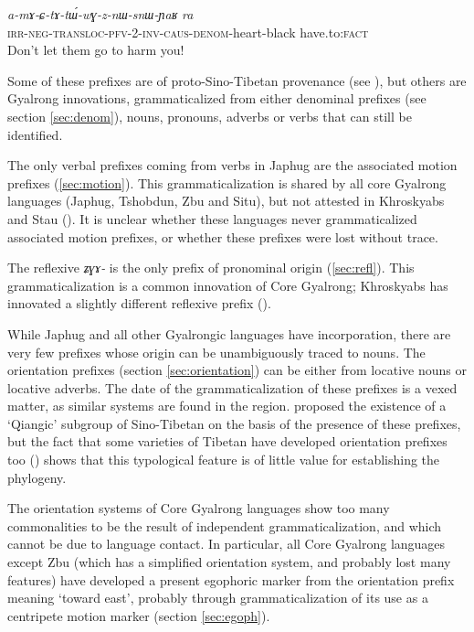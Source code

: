 \documentclass[oneside,a4paper,11pt]{article}
\newcommand{\ipa}[1]{\mbox{\phon\textit{#1}}} %
\begin{document}
\begin{exe}
\ex  \label{ex:amaCtAtWwGznWsnWYaR}
\gll
	\ipa{a-mɤ-ɕ-tɤ-tɯ́-wɣ-z-nɯ-snɯ-ɲaʁ}  	\ipa{ra}  \\
  \textsc{irr-neg-transloc-pfv-2-inv-caus-denom}-heart-black have.to:\textsc{fact} \\
\glt Don't let them go to harm you!
\end{exe} 

Some of these prefixes are of proto-Sino-Tibetan provenance (see \citealt{delancey11prefixes, delancey14second, jacques12agreement}), but others are Gyalrong innovations, grammaticalized from either denominal prefixes (see section \ref{sec:denom}), nouns, pronouns, adverbs or verbs that can still be identified.

The only verbal prefixes coming from verbs in Japhug are the associated motion prefixes (\ref{sec:motion}). This grammaticalization is shared by all core Gyalrong languages (Japhug, Tshobdun, Zbu and Situ), but not attested in Khroskyabs and Stau (\citealt{lai13affixale}). It is unclear whether these languages never grammaticalized associated motion prefixes, or whether these prefixes were lost without trace.

The reflexive \ipa{ʑɣɤ-} is the only prefix of pronominal origin (\ref{sec:refl}). This grammaticalization is a common innovation of Core Gyalrong; Khroskyabs has innovated a slightly different reflexive prefix (\citealt[156-7]{lai13affixale}).

While Japhug and all other Gyalrongic languages have incorporation, there are very few prefixes whose origin can be unambiguously traced to nouns. The orientation prefixes (section \ref{sec:orientation}) can be either from locative nouns or locative adverbs. The date of the grammaticalization of these prefixes is a vexed matter, as similar systems are found in the region. \citet{sun83liujiang} proposed the existence of a `Qiangic' subgroup of Sino-Tibetan on the basis of the presence of these prefixes, but the fact that some varieties of Tibetan have developed orientation prefixes too (\citealt{jackson07khalong}) shows that this typological feature is of little value for establishing the phylogeny.

The orientation systems of Core Gyalrong languages show too many commonalities to be the result of independent grammaticalization, and which cannot be due to language contact. In particular, all Core Gyalrong languages except Zbu (which has a simplified orientation system, and probably lost many features) have developed a present egophoric marker from the orientation prefix meaning `toward east', probably through grammaticalization of its use as a centripete motion marker (section \ref{sec:egoph}).
 
\end{document}
